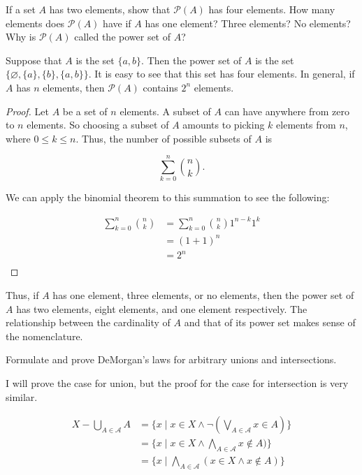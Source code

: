 \documentclass{zupan}
\begin{document}
\begin{problem}{8}
  If a set $A$ has two elements, show that $\mathscr{P}(A)$ has four elements.
  How many elements does $\mathscr{P}(A)$ have if $A$ has one element? Three
  elements? No elements? Why is $\mathscr{P}(A)$ called the power set of $A$?
\end{problem}

\begin{solution}
  Suppose that $A$ is the set $\{a, b\}$. Then the power set of $A$ is the set
  $\{\varnothing, \{a\}, \{b\}, \{a, b\}\}$. It is easy to see that this set
  has four elements. In general, if $A$ has $n$ elements, then $\mathscr{P}(A)$
  contains $2^n$ elements.

  \begin{proof}
    Let $A$ be a set of $n$ elements. A subset of $A$ can have anywhere from
    zero to $n$ elements. So choosing a subset of $A$ amounts to picking $k$
    elements from $n$, where $0 \leq k \leq n$. Thus, the number of possible
    subsets of $A$ is

    \[\sum_{k = 0}^n \binom{n}{k}.\]

    We can apply the binomial theorem to this summation to see the following:

    \[
      \begin{aligned}
        \sum_{k = 0}^n \binom{n}{k}
          & = \sum_{k = 0}^n \binom{n}{k}1^{n - k}1^k \\
          & = (1 + 1)^n \\
          & = 2^n \\
      \end{aligned}
    \]
  \end{proof}

  Thus, if $A$ has one element, three elements, or no elements, then the power
  set of $A$ has two elements, eight elements, and one element respectively.
  The relationship between the cardinality of $A$ and that of its power set
  makes sense of the nomenclature.
\end{solution}

\begin{problem}{9}
  Formulate and prove DeMorgan's laws for arbitrary unions and intersections.
\end{problem}

\begin{solution}
  I will prove the case for union, but the proof for the case for intersection
  is very similar.

  \[
    \begin{aligned}
      X - \bigcup_{A \in \mathscr{A}} A
        & = \{x \mid x \in X \land \neg (\bigvee_{A \in \mathscr{A}} x \in A)\} \\
        & = \{x \mid x \in X \land \bigwedge_{A \in \mathscr{A}} x \notin A)\} \\
        & = \{x \mid \bigwedge_{A \in \mathscr{A}} (x \in X \land x \notin A)\} \\
    \end{aligned}
  \]
\end{solution}
\end{document}
